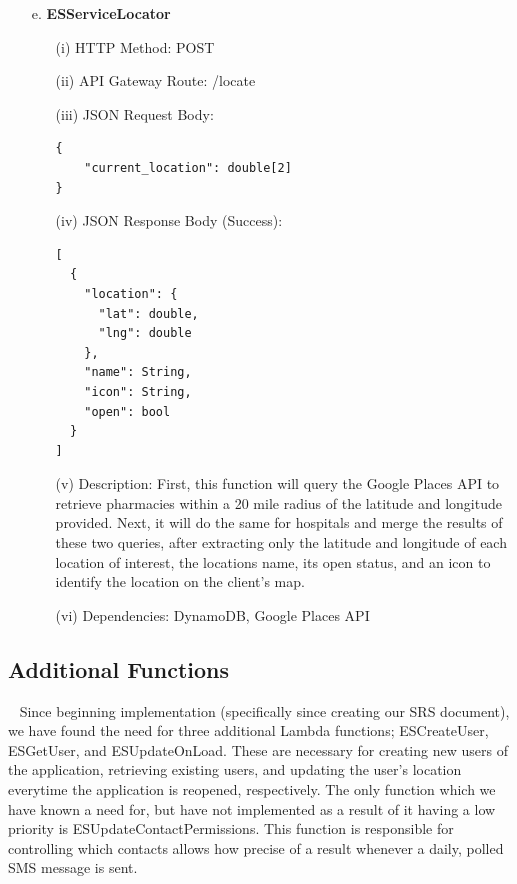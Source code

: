 \documentclass[10pt, a4paper]{article}
\begin{document}
\begin{enumerate}
	\item[e.] \textbf{ESServiceLocator}
		\begin{itemize}		
		\item[(i)] HTTP Method: POST
		\item[(ii)] API Gateway Route: /locate
		\item[(iii)] JSON Request Body:
			\begin{lstlisting}
{
    "current_location": double[2]   
}
			\end{lstlisting}
		\item[(iv)] JSON Response Body (Success):
			\begin{lstlisting}
[
  {
    "location": {
      "lat": double,
      "lng": double
    },
    "name": String,
    "icon": String,
    "open": bool
  }
]
			\end{lstlisting}
		\item[(v)] Description: First, this function will query the Google Places API to retrieve pharmacies within a 20 mile radius of the latitude and longitude provided. Next, it will do the same for hospitals and merge the results of these two queries, after extracting only the latitude and longitude of each location of interest, the locations name, its open status, and an icon to identify the location on the client's map. 
		\item[(vi)] Dependencies: DynamoDB, Google Places API
		\end{itemize}
	\end{enumerate}

\subsection{Additional Functions}
\par ~ Since beginning implementation (specifically since creating our SRS document), we have found the need for three additional Lambda functions; ESCreateUser, ESGetUser, and ESUpdateOnLoad. These are necessary for creating new users of the application, retrieving existing users, and updating the user's location everytime the application is reopened, respectively. The only function which we have known a need for, but have not implemented as a result of it having a low priority is ESUpdateContactPermissions. This function is responsible for controlling which contacts allows how precise of a result whenever a daily, polled SMS message is sent.
\end{document}
